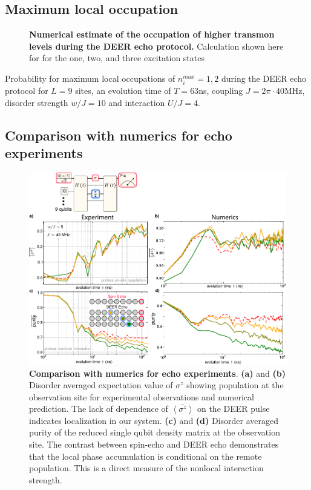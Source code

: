 \subsection{Maximum local occupation}
\begin{figure}
\centering
{}
\caption{\textbf{Numerical estimate of the occupation of higher transmon levels during the DEER echo protocol.} Calculation shown here for for the one, two, and three excitation states}
\label{figLocalOcc}
\end{figure}
Probability for maximum local occupations of $n_i^{max} = 1,2$ during the DEER echo protocol for $L=9$ sites, an evolution time of $T=63$ns, coupling $J=2\pi \cdot 40$MHz, disorder strength $w/J=10$ and interaction $U/J=4$.

\subsection{Comparison with numerics for echo experiments}
\begin{figure}
\centering
\includegraphics[width=140mm, keepaspectratio]{./PDF/echo_numerics_comparison_190919_944a.pdf}
\caption{\textbf{Comparison with numerics for echo experiments}.
\textbf{(a)} and \textbf{(b)} Disorder averaged expectation value of $\sigma^z$ showing population at the observation site for experimental observations and numerical prediction.
The lack of dependence of $\overline{ \left< \sigma^z \right> }$ on the DEER pulse indicates localization in our system.
\textbf{(c)} and \textbf{(d)} Disorder averaged purity of the reduced single qubit density matrix at the observation site.
The contrast between spin-echo and DEER echo demonstrates that the local phase accumulation is conditional on the remote population.
This is a direct measure of the nonlocal interaction strength.}
\end{figure}

